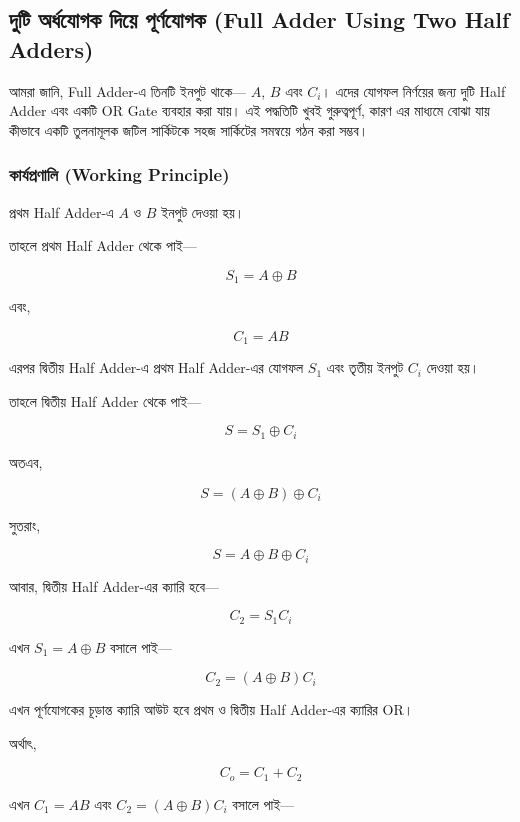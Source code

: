 
\subsection{দুটি অর্ধযোগক দিয়ে পূর্ণযোগক
(\textenglish{Full Adder Using Two Half Adders})}

আমরা জানি, \textenglish{Full Adder}-এ তিনটি ইনপুট থাকে— \(A\), \(B\) এবং \(C_i\)।
এদের যোগফল নির্ণয়ের জন্য দুটি \textenglish{Half Adder} এবং একটি \textenglish{OR Gate}
ব্যবহার করা যায়। এই পদ্ধতিটি খুবই গুরুত্বপূর্ণ, কারণ এর মাধ্যমে বোঝা যায়
কীভাবে একটি তুলনামূলক জটিল সার্কিটকে সহজ সার্কিটের সমন্বয়ে গঠন করা সম্ভব।

\subsubsection*{কার্যপ্রণালি
(\textenglish{Working Principle})}

প্রথম \textenglish{Half Adder}-এ \(A\) ও \(B\) ইনপুট দেওয়া হয়।

তাহলে প্রথম \textenglish{Half Adder} থেকে পাই—

\[
S_1=A\oplus B
\]

এবং,

\[
C_1=AB
\]

এরপর দ্বিতীয় \textenglish{Half Adder}-এ প্রথম \textenglish{Half Adder}-এর
যোগফল \(S_1\) এবং তৃতীয় ইনপুট \(C_i\) দেওয়া হয়।

তাহলে দ্বিতীয় \textenglish{Half Adder} থেকে পাই—

\[
S=S_1\oplus C_i
\]

অতএব,

\[
S=(A\oplus B)\oplus C_i
\]

সুতরাং,

\[
\boxed{S=A\oplus B\oplus C_i}
\]

আবার, দ্বিতীয় \textenglish{Half Adder}-এর ক্যারি হবে—

\[
C_2=S_1C_i
\]

এখন \(S_1=A\oplus B\) বসালে পাই—

\[
C_2=(A\oplus B)C_i
\]

এখন পূর্ণযোগকের চূড়ান্ত ক্যারি আউট হবে প্রথম ও দ্বিতীয়
\textenglish{Half Adder}-এর ক্যারির \textenglish{OR}।

অর্থাৎ,

\[
C_o=C_1+C_2
\]

এখন \(C_1=AB\) এবং \(C_2=(A\oplus B)C_i\) বসালে পাই—

